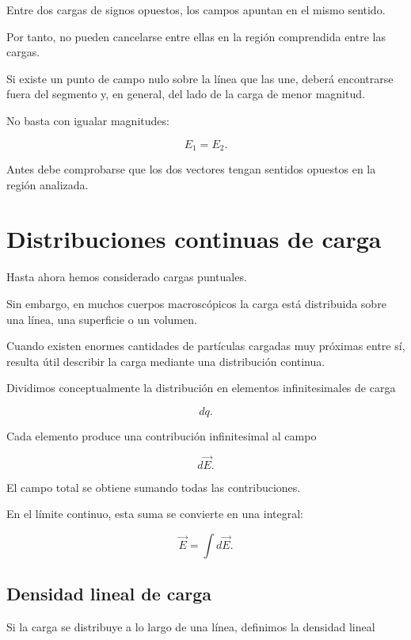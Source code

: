 Entre dos cargas de signos opuestos, los campos apuntan en el mismo sentido.

Por tanto, no pueden cancelarse entre ellas en la región comprendida entre las
cargas.

Si existe un punto de campo nulo sobre la línea que las une, deberá encontrarse
fuera del segmento y, en general, del lado de la carga de menor magnitud.

\begin{advertencia}

No basta con igualar magnitudes:

\[
E_1=E_2.
\]

Antes debe comprobarse que los dos vectores tengan sentidos opuestos en la región
analizada.

\end{advertencia}


\section{Distribuciones continuas de carga}

Hasta ahora hemos considerado cargas puntuales.

Sin embargo, en muchos cuerpos macroscópicos la carga está distribuida sobre una
línea, una superficie o un volumen.

Cuando existen enormes cantidades de partículas cargadas muy próximas entre sí,
resulta útil describir la carga mediante una distribución continua.

Dividimos conceptualmente la distribución en elementos infinitesimales de carga

\[
dq.
\]

Cada elemento produce una contribución infinitesimal al campo

\[
d\vec E.
\]

El campo total se obtiene sumando todas las contribuciones.

En el límite continuo, esta suma se convierte en una integral:

\begin{equation}
\boxed{\vec E=\int d\vec E}.
\label{eq:campo_distribucion_continua}
\end{equation}


\subsection{Densidad lineal de carga}

Si la carga se distribuye a lo largo de una línea, definimos la densidad lineal


